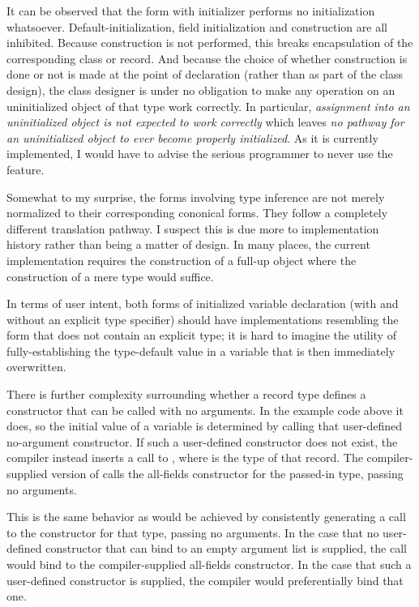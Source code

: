 It can be observed that the form with  initializer performs no
initialization whatsoever.  Default-initialization, field initialization and construction are
all inhibited.  Because construction is not performed, this breaks encapsulation of the
corresponding class or record.  And because the choice of whether construction is done or
not is made at the point of declaration (rather than as part of the class design), the
class designer is under no obligation to make any operation on an uninitialized object of
that type work correctly.  In particular, \emph{assignment into an uninitialized object is
  not expected to work correctly} which leaves \emph{no pathway for an uninitialized
  object to ever become properly initialized}.  As it is currently implemented, I would
have to advise the serious programmer to never use the  feature.

Somewhat to my surprise, the forms involving type inference are not merely normalized
to their corresponding cononical forms.  They follow a completely different translation
pathway.  I suspect this is due more to implementation history rather than being a matter
of design.  In many places, the current implementation requires the construction of a
full-up object where the construction of a mere type would suffice.  

In terms of user intent, both forms of initialized variable declaration (with and without
an explicit type specifier) should have implementations resembling the
form that does not contain an explicit type; it is hard to imagine the utility of
fully-establishing the type-default value in a variable that is then immediately overwritten.

There is further complexity surrounding whether a record type defines a constructor that
can be called with no arguments.  In the example code above it does, so the initial value of
a  variable is determined by calling that user-defined no-argument
constructor.  If such a user-defined constructor does not exist, the compiler instead
inserts a call to , where  is the type of that record.  The
compiler-supplied version of  calls the all-fields constructor for the
passed-in type, passing no arguments.  

This is the same behavior as would be achieved by consistently generating a call to the
constructor for that type, passing no arguments.  In the case that no user-defined
constructor that can bind to an empty argument list is supplied, the call would bind to
the compiler-supplied all-fields constructor.  In the case that such a user-defined
constructor is supplied, the compiler would preferentially bind that one.

